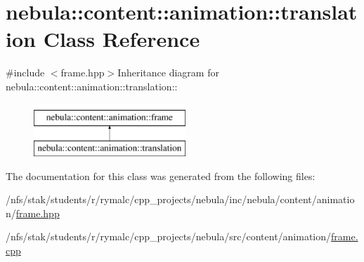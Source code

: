 \hypertarget{classnebula_1_1content_1_1animation_1_1translation}{
\section{nebula::content::animation::translation Class Reference}
\label{classnebula_1_1content_1_1animation_1_1translation}
}


{\ttfamily \#include $<$frame.hpp$>$}Inheritance diagram for nebula::content::animation::translation::\begin{figure}[H]
\begin{center}
\leavevmode
\includegraphics[height=2cm]{classnebula_1_1content_1_1animation_1_1translation}
\end{center}
\end{figure}


The documentation for this class was generated from the following files:\begin{DoxyCompactItemize}
\item 
/nfs/stak/students/r/rymalc/cpp\_\-projects/nebula/inc/nebula/content/animation/\hyperlink{frame_8hpp}{frame.hpp}\item 
/nfs/stak/students/r/rymalc/cpp\_\-projects/nebula/src/content/animation/\hyperlink{frame_8cpp}{frame.cpp}\end{DoxyCompactItemize}
